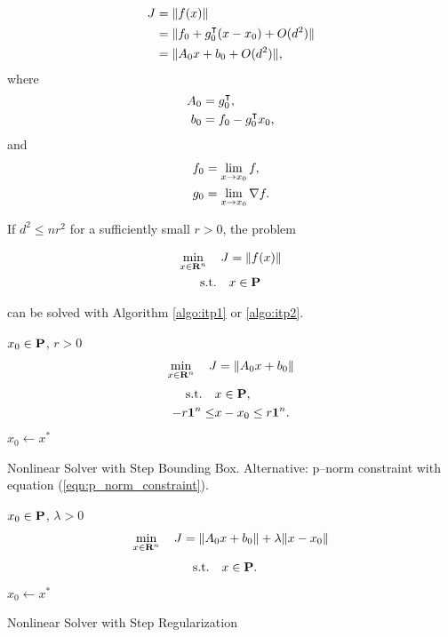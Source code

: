 \documentclass{article}
\begin{document}
    \begin{align*}
        J &= \|f(x)\|\\
        &= \|f_0+g_0^\intercal(x-x_0)+O(d^2)\|\\
        &= \|A_0x+b_0+O(d^2)\|,
    \end{align*}
    where
    \begin{align*}
        A_0&= g_0^\intercal,\\
        b_0&=f_0-g_0^\intercal x_0,
    \end{align*}
    and
    \begin{align*}
        f_0&=\lim_{x\to x_0} f,\\
        g_0&=\lim_{x\to x_0}\nabla f.
    \end{align*}

    If $d^2\leq nr^2$ for a sufficiently small $r>0$, the problem

    \begin{align}
        \min_{x\in\textbf{R}^n}\quad J &= \|f(x)\|\\
        \text{s.t.} \quad &x\in\textbf{P}\nonumber
    \end{align}

    can be solved with Algorithm \ref{algo:itp1} or \ref{algo:itp2}. 

    \begin{algorithm}[H]
        \SetAlgoLined
        $x_0 \in\textbf{P}$, $r>0$\\
        {
            \begin{align*}
                \min_{x\in\textbf{R}^n}\quad J = \|A_0x+b_0\|
            \end{align*}
            \begin{align*}
                \text{s.t.} \quad &x\in\textbf{P},\\
                -r\textbf{1}^n\leq&x-x_0\leq r\textbf{1}^n.
            \end{align*}
            $x_0\leftarrow x^*$
        }
    \caption{Nonlinear Solver with Step Bounding Box.
    Alternative: p--norm constraint with equation (\ref{eqn:p_norm_constraint}).}
    \label{algo:itp1}
    \end{algorithm}
    \begin{algorithm}[H]
        \SetAlgoLined
        $x_0 \in\textbf{P}$, $\lambda>0$\\
        {
            \begin{align*}
                \min_{x\in\textbf{R}^n}\quad J = \|A_0x+b_0\|+\lambda\|x-x_0\|
            \end{align*}
            \begin{align*}
                \text{s.t.} \quad &x\in\textbf{P}.
            \end{align*}
            $x_0\leftarrow x^*$
        }
    \caption{Nonlinear Solver with Step Regularization}
    \label{algo:itp2}
    \end{algorithm}
\end{document}
